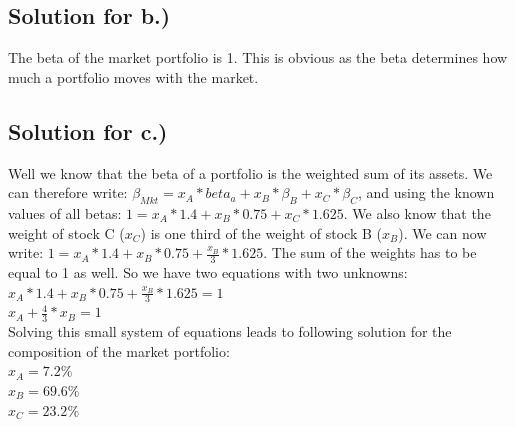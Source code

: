 \documentclass[a4paper,11pt,twoside]{article}
\begin{document}
\subsection{Solution for b.)}
The beta of the market portfolio is 1. This is obvious as the beta determines how much a portfolio moves with the market.

\subsection{Solution for c.)}
Well we know that the beta of a portfolio is the weighted sum of its assets. We can therefore write: $\beta_{Mkt} = x_A*beta_a + x_B*\beta_B + x_C*\beta_C$, and using the known values of all betas: $1 = x_A*1.4+x_B*0.75+x_C*1.625$. We also know that the weight of stock C ($x_C$) is one third of the weight of stock B ($x_B$). We can now write: $1 = x_A*1.4+x_B*0.75+\frac{x_B}{3}*1.625$. The sum of the weights has to be equal to 1 as well. So we have two equations with two unknowns: \\[10pt]
$x_A*1.4+x_B*0.75+\frac{x_B}{3}*1.625 = 1$ \\[5pt]
$x_A + \frac{4}{3}*x_B = 1$\\[10pt]

Solving this small system of equations leads to following solution for the composition of the market portfolio: \\[5pt]
$x_A = 7.2\%$\\
$x_B = 69.6\%$\\
$x_C = 23.2\%$\\







\end{document}
